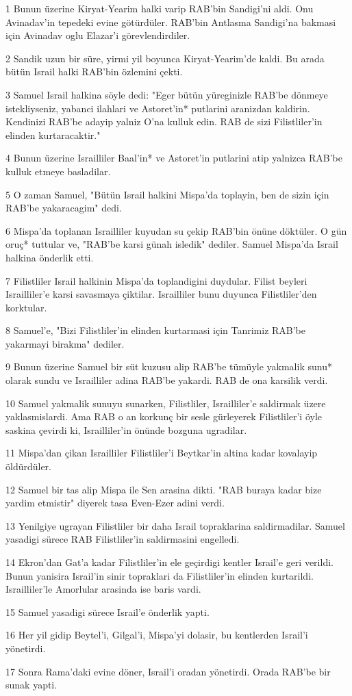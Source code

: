 \par 1 Bunun üzerine Kiryat-Yearim halki varip RAB'bin Sandigi'ni aldi. Onu Avinadav'in tepedeki evine götürdüler. RAB'bin Antlasma Sandigi'na bakmasi için Avinadav oglu Elazar'i görevlendirdiler.
\par 2 Sandik uzun bir süre, yirmi yil boyunca Kiryat-Yearim'de kaldi. Bu arada bütün Israil halki RAB'bin özlemini çekti.
\par 3 Samuel Israil halkina söyle dedi: "Eger bütün yüreginizle RAB'be dönmeye istekliyseniz, yabanci ilahlari ve Astoret'in* putlarini aranizdan kaldirin. Kendinizi RAB'be adayip yalniz O'na kulluk edin. RAB de sizi Filistliler'in elinden kurtaracaktir."
\par 4 Bunun üzerine Israilliler Baal'in* ve Astoret'in putlarini atip yalnizca RAB'be kulluk etmeye basladilar.
\par 5 O zaman Samuel, "Bütün Israil halkini Mispa'da toplayin, ben de sizin için RAB'be yakaracagim" dedi.
\par 6 Mispa'da toplanan Israilliler kuyudan su çekip RAB'bin önüne döktüler. O gün oruç* tuttular ve, "RAB'be karsi günah isledik" dediler. Samuel Mispa'da Israil halkina önderlik etti.
\par 7 Filistliler Israil halkinin Mispa'da toplandigini duydular. Filist beyleri Israilliler'e karsi savasmaya çiktilar. Israilliler bunu duyunca Filistliler'den korktular.
\par 8 Samuel'e, "Bizi Filistliler'in elinden kurtarmasi için Tanrimiz RAB'be yakarmayi birakma" dediler.
\par 9 Bunun üzerine Samuel bir süt kuzusu alip RAB'be tümüyle yakmalik sunu* olarak sundu ve Israilliler adina RAB'be yakardi. RAB de ona karsilik verdi.
\par 10 Samuel yakmalik sunuyu sunarken, Filistliler, Israilliler'e saldirmak üzere yaklasmislardi. Ama RAB o an korkunç bir sesle gürleyerek Filistliler'i öyle saskina çevirdi ki, Israilliler'in önünde bozguna ugradilar.
\par 11 Mispa'dan çikan Israilliler Filistliler'i Beytkar'in altina kadar kovalayip öldürdüler.
\par 12 Samuel bir tas alip Mispa ile Sen arasina dikti. "RAB buraya kadar bize yardim etmistir" diyerek tasa Even-Ezer adini verdi.
\par 13 Yenilgiye ugrayan Filistliler bir daha Israil topraklarina saldirmadilar. Samuel yasadigi sürece RAB Filistliler'in saldirmasini engelledi.
\par 14 Ekron'dan Gat'a kadar Filistliler'in ele geçirdigi kentler Israil'e geri verildi. Bunun yanisira Israil'in sinir topraklari da Filistliler'in elinden kurtarildi. Israilliler'le Amorlular arasinda ise baris vardi.
\par 15 Samuel yasadigi sürece Israil'e önderlik yapti.
\par 16 Her yil gidip Beytel'i, Gilgal'i, Mispa'yi dolasir, bu kentlerden Israil'i yönetirdi.
\par 17 Sonra Rama'daki evine döner, Israil'i oradan yönetirdi. Orada RAB'be bir sunak yapti.

